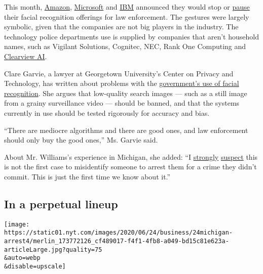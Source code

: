 This month,
\href{https://www.nytimes.com/2020/06/10/technology/amazon-facial-recognition-backlash.html}{Amazon},
\href{https://www.cnn.com/2020/06/18/tech/brad-smith-microsoft-facial-recognition/index.html}{Microsoft}
and
\href{https://www.axios.com/ibm-is-exiting-the-face-recognition-business-62e79f09-34a2-4f1d-a541-caba112415c6.html}{IBM}
announced they would stop or
\href{https://www.nytimes.com/aponline/2020/06/11/business/bc-us-microsoft-police-facial-recognition.html}{pause}
their facial recognition offerings for law enforcement. The gestures
were largely symbolic, given that the companies are not big players in
the industry. The technology police departments use is supplied by
companies that aren't household names, such as Vigilant Solutions,
Cognitec, NEC, Rank One Computing and
\href{https://www.nytimes.com/2020/01/18/technology/clearview-privacy-facial-recognition.html}{Clearview
AI}.

Clare Garvie, a lawyer at Georgetown University's Center on Privacy and
Technology, has written about problems with the
\href{https://www.flawedfacedata.com/}{government's use of facial
recognition}. She argues that low-quality search images --- such as a
still image from a grainy surveillance video --- should be banned, and
that the systems currently in use should be tested rigorously for
accuracy and bias.

``There are mediocre algorithms and there are good ones, and law
enforcement should only buy the good ones,'' Ms. Garvie said.

About Mr. Williams's experience in Michigan, she added: ``I
\href{https://www.aclu.org/blog/privacy-technology/surveillance-technologies/florida-using-facial-recognition-convict-people}{strongly}
\href{https://nymag.com/intelligencer/2019/11/the-future-of-facial-recognition-in-america.html}{suspect}
this is not the first case to misidentify someone to arrest them for a
crime they didn't commit. This is just the first time we know about
it.''

\hypertarget{in-a-perpetual-lineup}{%
\subsection{In a perpetual lineup}\label{in-a-perpetual-lineup}}

\texttt{[image: https://static01.nyt.com/images/2020/06/24/business/24michigan-arrest4/merlin\_173772126\_cf489017-f4f1-4fb8-a049-bd15c81e623a-articleLarge.jpg?quality=75\\\&auto=webp\\\&disable=upscale]}

